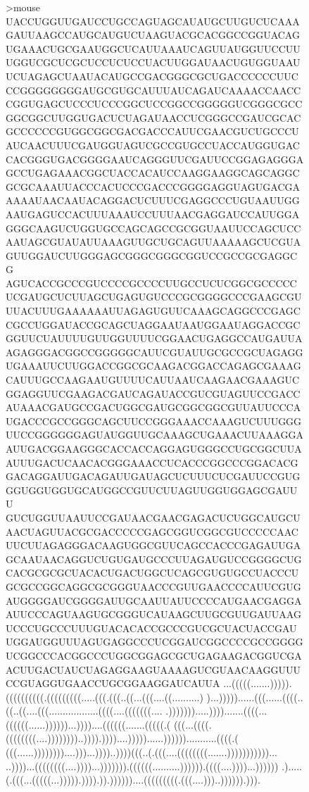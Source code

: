 \begin{figure}[H]
\begin{code}[fontsize=\scriptsize, frame=none, samepage=true]
>mouse
UACCUGGUUGAUCCUGCCAGUAGCAUAUGCUUGUCUCAAAGAUUAAGCCAUGCAUGUCUAAGUACGCACGGCCGGUACAG
UGAAACUGCGAAUGGCUCAUUAAAUCAGUUAUGGUUCCUUUGGUCGCUCGCUCCUCUCCUACUUGGAUAACUGUGGUAAU
UCUAGAGCUAAUACAUGCCGACGGGCGCUGACCCCCCUUCCCGGGGGGGGAUGCGUGCAUUUAUCAGAUCAAAACCAACC
CGGUGAGCUCCCUCCCGGCUCCGGCCGGGGGUCGGGCGCCGGCGGCUUGGUGACUCUAGAUAACCUCGGGCCGAUCGCAC
GCCCCCCGUGGCGGCGACGACCCAUUCGAACGUCUGCCCUAUCAACUUUCGAUGGUAGUCGCCGUGCCUACCAUGGUGAC
CACGGGUGACGGGGAAUCAGGGUUCGAUUCCGGAGAGGGAGCCUGAGAAACGGCUACCACAUCCAAGGAAGGCAGCAGGC
GCGCAAAUUACCCACUCCCGACCCGGGGAGGUAGUGACGAAAAAUAACAAUACAGGACUCUUUCGAGGCCCUGUAAUUGG
AAUGAGUCCACUUUAAAUCCUUUAACGAGGAUCCAUUGGAGGGCAAGUCUGGUGCCAGCAGCCGCGGUAAUUCCAGCUCC
AAUAGCGUAUAUUAAAGUUGCUGCAGUUAAAAAGCUCGUAGUUGGAUCUUGGGAGCGGGCGGGCGGUCCGCCGCGAGGCG
AGUCACCGCCCGUCCCCGCCCCUUGCCUCUCGGCGCCCCCUCGAUGCUCUUAGCUGAGUGUCCCGCGGGGCCCGAAGCGU
UUACUUUGAAAAAAUUAGAGUGUUCAAAGCAGGCCCGAGCCGCCUGGAUACCGCAGCUAGGAAUAAUGGAAUAGGACCGC
GGUUCUAUUUUGUUGGUUUUCGGAACUGAGGCCAUGAUUAAGAGGGACGGCCGGGGGCAUUCGUAUUGCGCCGCUAGAGG
UGAAAUUCUUGGACCGGCGCAAGACGGACCAGAGCGAAAGCAUUUGCCAAGAAUGUUUUCAUUAAUCAAGAACGAAAGUC
GGAGGUUCGAAGACGAUCAGAUACCGUCGUAGUUCCGACCAUAAACGAUGCCGACUGGCGAUGCGGCGGCGUUAUUCCCA
UGACCCGCCGGGCAGCUUCCGGGAAACCAAAGUCUUUGGGUUCCGGGGGGAGUAUGGUUGCAAAGCUGAAACUUAAAGGA
AUUGACGGAAGGGCACCACCAGGAGUGGGCCUGCGGCUUAAUUUGACUCAACACGGGAAACCUCACCCGGCCCGGACACG
GACAGGAUUGACAGAUUGAUAGCUCUUUCUCGAUUCCGUGGGUGGUGGUGCAUGGCCGUUCUUAGUUGGUGGAGCGAUUU
GUCUGGUUAAUUCCGAUAACGAACGAGACUCUGGCAUGCUAACUAGUUACGCGACCCCCGAGCGGUCGGCGUCCCCCAAC
UUCUUAGAGGGACAAGUGGCGUUCAGCCACCCGAGAUUGAGCAAUAACAGGUCUGUGAUGCCCUUAGAUGUCCGGGGCUG
CACGCGCGCUACACUGACUGGCUCAGCGUGUGCCUACCCUGCGCCGGCAGGCGCGGGUAACCCGUUGAACCCCAUUCGUG
AUGGGGAUCGGGGAUUGCAAUUAUUCCCCAUGAACGAGGAAUUCCCAGUAAGUGCGGGUCAUAAGCUUGCGUUGAUUAAG
UCCCUGCCCUUUGUACACACCGCCCGUCGCUACUACCGAUUGGAUGGUUUAGUGAGGCCCUCGGAUCGGCCCCGCCGGGG
UCGGCCCACGGCCCUGGCGGAGCGCUGAGAAGACGGUCGAACUUGACUAUCUAGAGGAAGUAAAAGUCGUAACAAGGUUU
CCGUAGGUGAACCUGCGGAAGGAUCAUUA
...(((((.......))))).((((((((((.(((((((((.....(((.(((..((...(((....((..........)
)...)))))......(((......((((..((..((....(((..................((((....(((((((....
.))))))).....)))).......((((...((((((......))))))...))))....((((((.......(((((.(
(((...((((.((((((((....))))))))..)))).))))....)))))......))))))...........((((.(
(((......))))))))....)))...))))..))))(((..(.(((....((((((((.......)))))))))))...
..))))...((((((((....))))...))))))).((((((..........)))))).((((....))))...))))))
.).....(.(((...(((((...))))).)))).)).))))))....(((((((((.(((....)))..)))))).))).

\end{code}
\end{figure}
